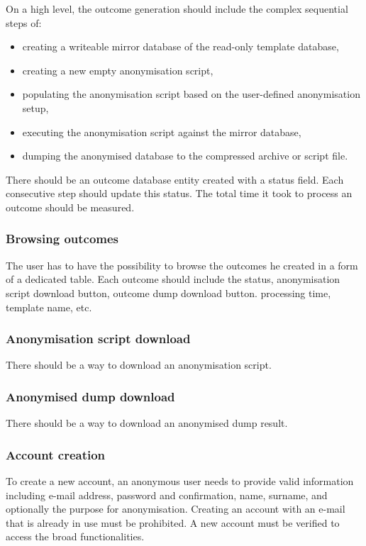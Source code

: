 \documentclass[a4paper,twoside,12pt]{book}
\begin{document}
On a high level, the outcome generation should include the complex sequential steps of:
\begin{itemize}
\item creating a writeable mirror database of the read-only template database,
\item creating a new empty anonymisation script,
\item populating the anonymisation script based on the user-defined anonymisation setup,
\item executing the anonymisation script against the mirror database,
\item dumping the anonymised database to the compressed archive or script file.
\end{itemize} 

There should be an outcome database entity created with a status field. Each consecutive step should update this status. The total time it took to process an outcome should be measured.

\subsubsection{Browsing outcomes}

The user has to have the possibility to browse the outcomes he created in a form of a dedicated table. Each outcome should include the status, anonymisation script download button, outcome dump download button. processing time, template name, etc.

\subsubsection{Anonymisation script download}

There should be a way to download an anonymisation script.

\subsubsection{Anonymised dump download}

There should be a way to download an anonymised dump result.

\subsubsection{Account creation}

To create a new account, an anonymous user needs to provide valid information including e-mail address, password and confirmation, name, surname, and optionally the purpose for anonymisation. Creating an account with an e-mail that is already in use must be prohibited. A new account must be verified to access the broad functionalities.
\end{document}
